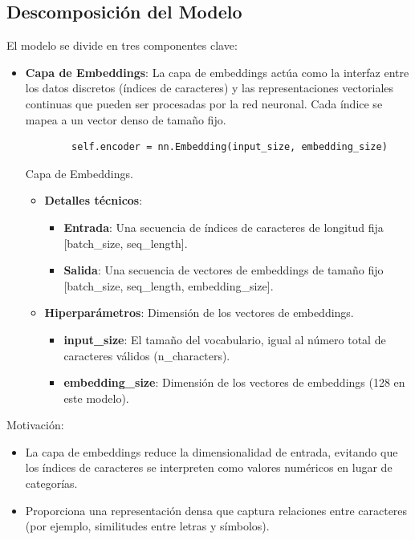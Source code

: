 \documentclass{article}
\begin{document}
\subsection{Descomposición del Modelo}
El modelo se divide en tres componentes clave:
\begin{itemize}
    \item \textbf{Capa de Embeddings}: La capa de embeddings actúa como la interfaz entre los datos discretos (índices de caracteres) y las representaciones vectoriales continuas que pueden ser procesadas por la red neuronal. Cada índice se mapea a un vector denso de tamaño fijo.
    \begin{listing}[H]
    \begin{verbatim}
        self.encoder = nn.Embedding(input_size, embedding_size)
    \end{verbatim}
    \caption{Capa de Embeddings.}
    \end{listing}
    \begin{itemize}
        \item \textbf{Detalles técnicos}:
        \begin{itemize}
            \item \textbf{Entrada}: Una secuencia de índices de caracteres de longitud fija [batch\_size, seq\_length].
            \item \textbf{Salida}: Una secuencia de vectores de embeddings de tamaño fijo [batch\_size, seq\_length, embedding\_size].
        \end{itemize}
        \item \textbf{Hiperparámetros}: Dimensión de los vectores de embeddings.
        \begin{itemize}
            \item \textbf{input\_size}: El tamaño del vocabulario, igual al número total de caracteres válidos (n\_characters).
            \item \textbf{embedding\_size}: Dimensión de los vectores de embeddings (128 en este modelo).
        \end{itemize}
    \end{itemize}
\end{itemize}

{\large{Motivación}}:
\begin{itemize}
    \item La capa de embeddings reduce la dimensionalidad de entrada, evitando que los índices de caracteres se interpreten como valores numéricos en lugar de categorías.
    \item Proporciona una representación densa que captura relaciones entre caracteres (por ejemplo, similitudes entre letras y símbolos).
\end{itemize}
\end{document}
